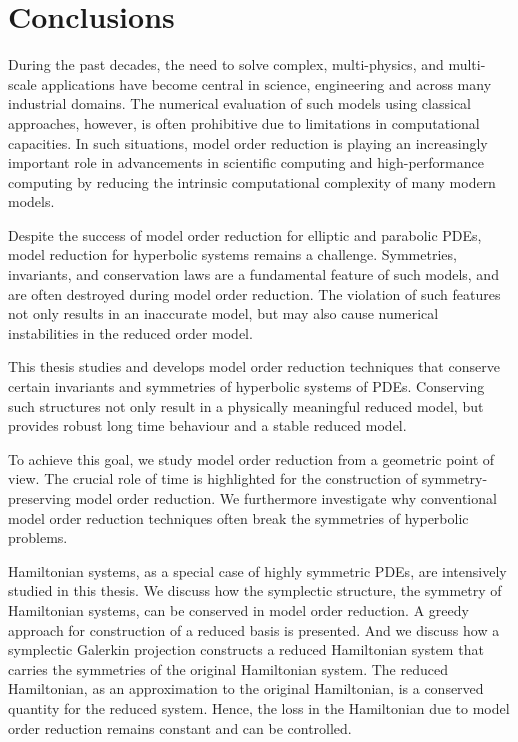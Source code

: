 \chapter{Conclusions} \label{chapter:8}

During the past decades, the need to solve complex, multi-physics, and multi-scale applications have become central in science, engineering and across many industrial domains. The numerical evaluation of such models using classical approaches, however, is often prohibitive due to limitations in computational capacities. In such situations, model order reduction is playing an increasingly important role in advancements in scientific computing and high-performance computing by reducing the intrinsic computational complexity of many modern models.

Despite the success of model order reduction for elliptic and parabolic PDEs, model reduction for hyperbolic systems remains a challenge. Symmetries, invariants, and conservation laws are a fundamental feature of such models, and are often destroyed during model order reduction. The violation of such features not only results in an inaccurate model, but may also cause numerical instabilities in the reduced order model.

This thesis studies and develops model order reduction techniques that conserve certain invariants and symmetries of hyperbolic systems of PDEs. Conserving such structures not only result in a physically meaningful reduced model, but provides robust long time behaviour and a stable reduced model.

To achieve this goal, we study model order reduction from a geometric point of view. The crucial role of time is highlighted for the construction of symmetry-preserving model order reduction. We furthermore investigate why conventional model order reduction techniques often break the symmetries of hyperbolic problems.

Hamiltonian systems, as a special case of highly symmetric PDEs, are intensively studied in this thesis. We discuss how the symplectic structure, the symmetry of Hamiltonian systems, can be conserved in model order reduction. A greedy approach for construction of a reduced basis is presented. And we discuss how a symplectic Galerkin projection constructs a reduced Hamiltonian system that carries the symmetries of the original Hamiltonian system. The reduced Hamiltonian, as an approximation to the original Hamiltonian, is a conserved quantity for the reduced system. Hence, the loss in the Hamiltonian due to model order reduction remains constant and can be controlled.

